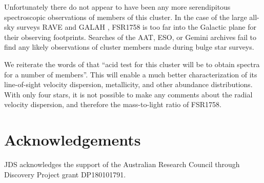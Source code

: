 \documentclass[fleqn,usenatbib,letters]{mnras}
\begin{document}
Unfortunately there do not appear to have been any more serendipitous spectroscopic observations of members of this cluster. In the case of the large all-sky surveys RAVE \citep{Kunder:2017gp} and GALAH \citep{DeSilva:2015gr,Buder2018}, FSR1758 is too far into the Galactic plane for their observing footprints. Searches of the AAT, ESO, or Gemini archives fail to find any likely observations of cluster members made during bulge star surveys.

We reiterate the words of \citet{Barba2018} that ``acid test for this cluster will be to obtain spectra for a number of members''. This will enable a much better characterization of its line-of-sight velocity dispersion, metallicity, and other abundance distributions. With only four stars, it is not possible to make any comments about the radial velocity dispersion, and therefore the mass-to-light ratio of FSR1758.

\section*{Acknowledgements}

JDS acknowledges the support of the Australian Research Council through Discovery Project grant DP180101791.












\bsp	%
\label{lastpage}
\end{document}
